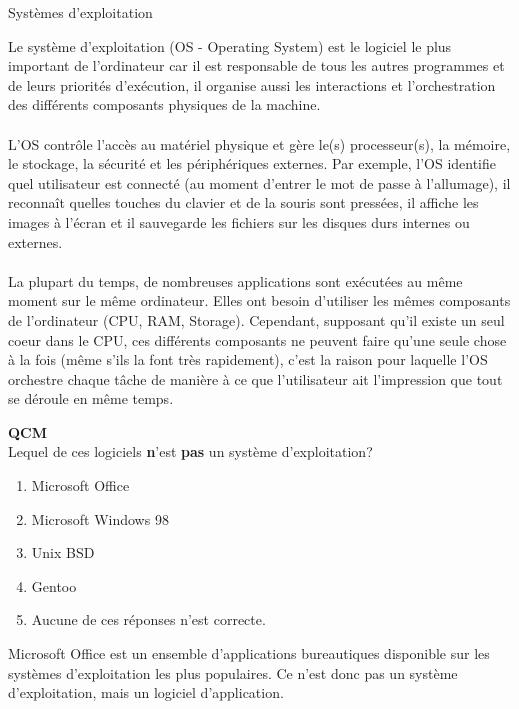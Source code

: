 \begin{section}{Systèmes d'exploitation}
    
Le système d'exploitation (OS - Operating System) est le logiciel le plus important de l'ordinateur car il est responsable de tous les autres programmes et de leurs priorités d'exécution, il organise aussi les interactions et l'orchestration des différents composants physiques de la machine.
\\\\
L'OS contrôle l'accès au matériel physique et gère le(s) processeur(s), la mémoire, le stockage, la sécurité et les périphériques externes. Par exemple, l'OS identifie quel utilisateur est connecté (au moment d'entrer le mot de passe à l'allumage), il reconnaît quelles touches du clavier et de la souris sont pressées, il affiche les images à l'écran et il sauvegarde les fichiers sur les disques durs internes ou externes.
\\\\
La plupart du temps, de nombreuses applications sont exécutées au même moment sur le même ordinateur. Elles ont besoin d'utiliser les mêmes composants de l'ordinateur (CPU, RAM, Storage). Cependant, supposant qu'il existe un seul coeur dans le CPU, ces différents composants ne peuvent faire qu'une seule chose à la fois (même s'ils la font très rapidement), c'est la raison pour laquelle l'OS orchestre chaque tâche de manière à ce que l'utilisateur ait l'impression que tout se déroule en même temps.
\\

    \begin{Exercice}[2 minutes]  \textbf{QCM}\\
    Lequel de ces logiciels \textbf{n}'est \textbf{pas} un système d'exploitation?
        \begin{enumerate}
            \item Microsoft Office 
            \item Microsoft Windows 98
            \item Unix BSD
            \item Gentoo
            \item Aucune de ces réponses n'est correcte.
        \end{enumerate}
    \end{Exercice}
    \begin{solution}
                Microsoft Office est un ensemble d'applications bureautiques disponible sur les systèmes d'exploitation les plus populaires.
		Ce n'est donc pas un système d'exploitation, mais un logiciel d'application. 
    \end{solution}


\end{section}
